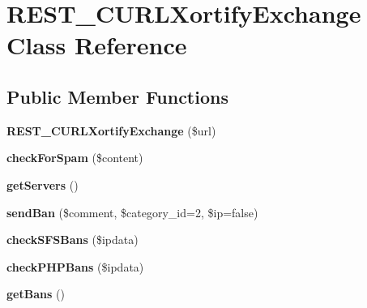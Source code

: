 \hypertarget{class_r_e_s_t___c_u_r_l_xortify_exchange}{\section{R\-E\-S\-T\-\_\-\-C\-U\-R\-L\-Xortify\-Exchange Class Reference}
\label{class_r_e_s_t___c_u_r_l_xortify_exchange}
}
\subsection*{Public Member Functions}
\begin{DoxyCompactItemize}
\item 
\hypertarget{class_r_e_s_t___c_u_r_l_xortify_exchange_a0158f268fc7102a5d426a69dfd806885}{{\bfseries R\-E\-S\-T\-\_\-\-C\-U\-R\-L\-Xortify\-Exchange} (\$url)}\label{class_r_e_s_t___c_u_r_l_xortify_exchange_a0158f268fc7102a5d426a69dfd806885}

\item 
\hypertarget{class_r_e_s_t___c_u_r_l_xortify_exchange_a7a4f53c3841dc7806455261af557d514}{{\bfseries check\-For\-Spam} (\$content)}\label{class_r_e_s_t___c_u_r_l_xortify_exchange_a7a4f53c3841dc7806455261af557d514}

\item 
\hypertarget{class_r_e_s_t___c_u_r_l_xortify_exchange_a882f365bc81e207dc2123ef707735e82}{{\bfseries get\-Servers} ()}\label{class_r_e_s_t___c_u_r_l_xortify_exchange_a882f365bc81e207dc2123ef707735e82}

\item 
\hypertarget{class_r_e_s_t___c_u_r_l_xortify_exchange_a0293acfa4afe0cb5b2816352a35d8ca7}{{\bfseries send\-Ban} (\$comment, \$category\-\_\-id=2, \$ip=false)}\label{class_r_e_s_t___c_u_r_l_xortify_exchange_a0293acfa4afe0cb5b2816352a35d8ca7}

\item 
\hypertarget{class_r_e_s_t___c_u_r_l_xortify_exchange_a985a563a84e3e5c54694fcce192bda53}{{\bfseries check\-S\-F\-S\-Bans} (\$ipdata)}\label{class_r_e_s_t___c_u_r_l_xortify_exchange_a985a563a84e3e5c54694fcce192bda53}

\item 
\hypertarget{class_r_e_s_t___c_u_r_l_xortify_exchange_aeb1bf9aaee4718870adbd07333490aaf}{{\bfseries check\-P\-H\-P\-Bans} (\$ipdata)}\label{class_r_e_s_t___c_u_r_l_xortify_exchange_aeb1bf9aaee4718870adbd07333490aaf}

\item 
\hypertarget{class_r_e_s_t___c_u_r_l_xortify_exchange_aea26db2906896833d32445a698fc4cdc}{{\bfseries get\-Bans} ()}\label{class_r_e_s_t___c_u_r_l_xortify_exchange_aea26db2906896833d32445a698fc4cdc}


\end{DoxyCompactItemize}
